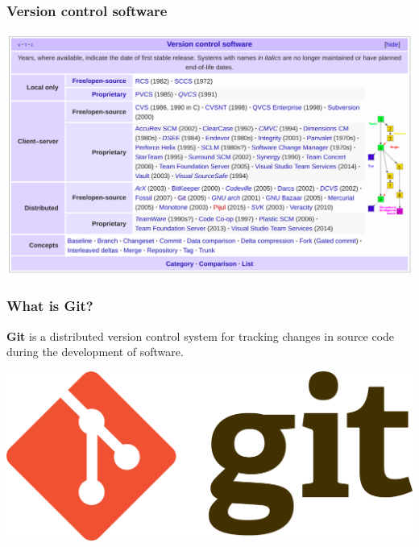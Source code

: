 \documentclass[svgnames]{beamer}
\begin{document}
\begin{frame}
    \frametitle{Version control software}
    \begin{center}
        \includegraphics[scale=0.29]{img/controlVersion.png}
    \end{center}
\end{frame}


\begin{frame}
    \frametitle{What is Git?}

    \textbf{Git} is a distributed version control system for tracking changes in source code during the development of software.

    \hfill \break

    \begin{center}
        \includegraphics[scale=0.07]{img/git_logo.png}
    \end{center}
\end{frame}
\end{document}
